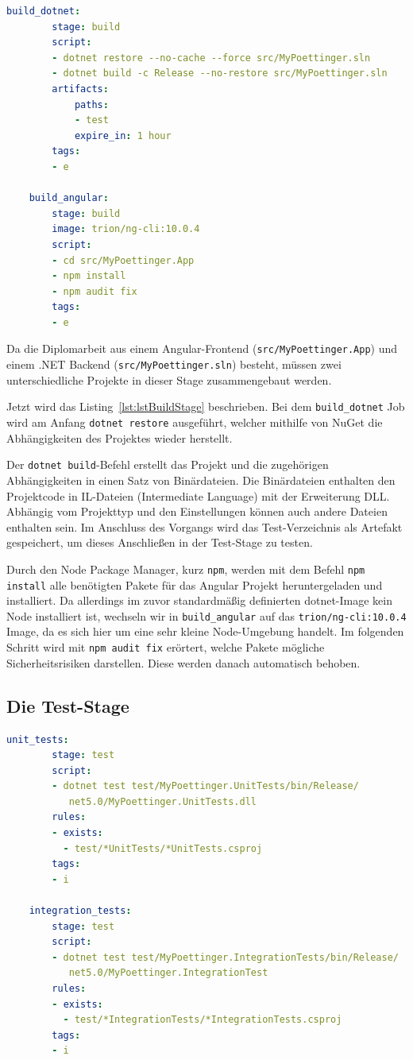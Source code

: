 \begin{lstlisting}[caption={Die Build-Stage der gitlab-ci.yml Datei}, language=yaml, label={lst:lstBuildStage}]
	build_dotnet:
		stage: build
		script:
		- dotnet restore --no-cache --force src/MyPoettinger.sln
		- dotnet build -c Release --no-restore src/MyPoettinger.sln
  		artifacts:
			paths:
			- test
			expire_in: 1 hour
		tags:
		- e
	
	build_angular:
		stage: build
		image: trion/ng-cli:10.0.4
		script: 
		- cd src/MyPoettinger.App
		- npm install
		- npm audit fix
		tags:
		- e
\end{lstlisting}

Da die Diplomarbeit aus einem Angular-Frontend (\texttt{src/MyPoettinger.App}) und einem .NET Backend (\texttt{src/MyPoettinger.sln}) besteht, müssen zwei unterschiedliche Projekte in dieser Stage zusammengebaut werden. 

Jetzt wird das Listing~\ref{lst:lstBuildStage} beschrieben. Bei dem \texttt{build\_dotnet} Job wird am Anfang \texttt{dotnet restore} ausgeführt, welcher mithilfe von NuGet die Abhängigkeiten des Projektes wieder herstellt. 

Der \texttt{dotnet build}-Befehl erstellt das Projekt und die zugehörigen Abhängigkeiten in einen Satz von Binärdateien. Die Binärdateien enthalten den Projektcode in IL-Dateien (Intermediate Language) mit der Erweiterung DLL. Abhängig vom Projekttyp und den Einstellungen können auch andere Dateien enthalten sein.\cite{dotnetBuildDesc} Im Anschluss des Vorgangs wird das Test-Verzeichnis als Artefakt gespeichert, um dieses Anschließen in der Test-Stage zu testen.

Durch den Node Package Manager, kurz \texttt{npm}, werden mit dem Befehl \texttt{npm install} alle benötigten Pakete für das Angular Projekt heruntergeladen und installiert. Da allerdings im zuvor standardmäßig definierten dotnet-Image kein Node installiert ist, wechseln wir in \texttt{build\_angular} auf das \texttt{trion/ng-cli:10.0.4} Image, da es sich hier um eine sehr kleine Node-Umgebung handelt. Im folgenden Schritt wird mit \texttt{npm audit fix} erörtert, welche Pakete mögliche Sicherheitsrisiken darstellen. Diese werden danach automatisch behoben. 

\subsection{Die Test-Stage}

\begin{lstlisting}[caption={Die Test-Stage der gitlab-ci.yml Datei}, language=yaml, label={lst:lstTestStage}]
	unit_tests:
		stage: test
		script: 
		- dotnet test test/MyPoettinger.UnitTests/bin/Release/
		   net5.0/MyPoettinger.UnitTests.dll
		rules:
		- exists:
		  - test/*UnitTests/*UnitTests.csproj
		tags:
		- i  
	
	integration_tests:
		stage: test
		script: 
		- dotnet test test/MyPoettinger.IntegrationTests/bin/Release/
		   net5.0/MyPoettinger.IntegrationTest
		rules:
		- exists:
		  - test/*IntegrationTests/*IntegrationTests.csproj
		tags:
		- i
\end{lstlisting}

